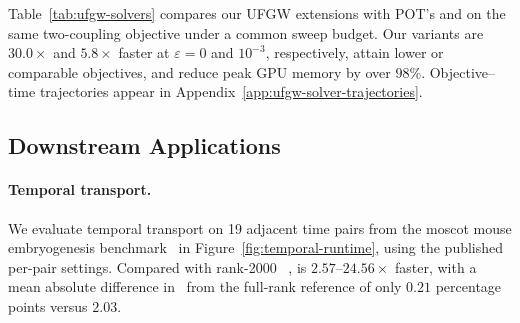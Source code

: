 Table~\ref{tab:ufgw-solvers} compares our UFGW extensions with POT's \bcdmm and \bcdsinkhorn on the same two-coupling objective under a common sweep budget.
Our variants are $30.0\times$ and $5.8\times$ faster at $\varepsilon=0$ and $10^{-3}$, respectively, attain lower or comparable objectives, and reduce peak GPU memory by over $98\%$.
Objective--time trajectories appear in Appendix~\ref{app:ufgw-solver-trajectories}.


\subsection{Downstream Applications}
\label{sec:downstream-applications}

\paragraph{Temporal transport.}
We evaluate temporal transport on 19 adjacent time pairs from the moscot mouse embryogenesis benchmark~\citep{klein2025mapping} in Figure~\ref{fig:temporal-runtime}, using the published per-pair settings.
Compared with rank-2000 \ulot~\citep{scetbon2023unbalanced}, \ourssparsink is $2.57$--$24.56\times$ faster, with a mean absolute difference in \transitionacc\ from the full-rank \sinkhorn reference of only $0.21$ percentage points versus $2.03$.

